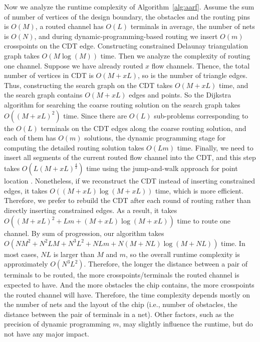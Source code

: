 \documentclass[journal]{IEEEtran}
\begin{document}
Now we analyze the runtime complexity of Algorithm~\ref{alg:aarf}. 
Assume the sum of number of vertices of the design boundary, the obstacles and the routing pins is $O(M)$, a routed channel has $O(L)$ terminals in average, the number of nets is $O(N)$, and during dynamic-programming-based routing we insert $O(m)$ crosspoints on the CDT edge. 
Constructing constrained Delaunay triangulation graph takes $O(M\log(M))$ time\cite{Sloan:1993}.
Then we analyze the complexity of routing one channel. 
Suppose we have already routed $x$ flow channels. 
Thence, the total number of vertices in CDT is $O(M + xL)$, so is the number of triangle edges. 
Thus, constructing the search graph on the CDT takes $O(M + xL)$ time, 
and the search graph contains $O(M + xL)$ edges and points. 
So the Dijkstra algorithm for searching the coarse routing solution on the search graph takes $O((M + xL)^2)$ time.
Since there are $O(L)$ sub-problems corresponding to the $O(L)$ terminals on the CDT edges along the coarse routing solution, and each of them has $O(m)$ solutions, the dynamic programming stage for computing the detailed routing solution takes $O(Lm)$ time. 
Finally, we need to insert all segments of the current routed flow channel into the CDT, and this step takes $O(L(M + xL)^\frac{4}{3})$ time using the jump-and-walk approach for point location \cite{Kallmann:2004dt}. 
Nonetheless, if we reconstruct the CDT instead of inserting constrained edges, it takes $O((M + xL)\log(M + xL))$ time, which is more efficient. 
Therefore, we prefer to rebuild the CDT after each round of routing rather than directly inserting constrained edges. 
As a result, it takes $O((M + xL)^2 + Lm + (M + xL)\log(M + xL))$ time to route one channel. 
By sum of progression, our algorithm takes $O(NM^2 + N^2LM + N^3L^2 + NLm + N(M + NL)\log(M + NL))$ time. 
In most cases, $NL$ is larger than $M$ and $m$, so the overall runtime complexity is approximately $O(N^3L^2)$. 
Therefore, the longer the distance between a pair of terminals to be routed, the more crosspoints/terminals the routed channel is expected to have. And the more obstacles the chip contains, the more crosspoints the routed channel will have. Therefore, the time complexity depends mostly on the number of nets and the layout of the chip (i.e., number of obstacles, the distance between the pair of terminals in a net). Other factors, such as the precision of dynamic programming $m$, may slightly influence the runtime, but do not have any major impact.

\end{document}
